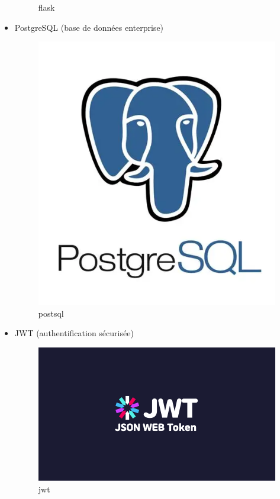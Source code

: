 \begin{itemize}
\begin{figure}[H]
    \caption{flask}
    \label{fig:flask}
\end{figure}
    \item PostgreSQL (base de données enterprise)
     \begin{figure}[H]
    \centering
    \includegraphics[width=\figwidth]{img/postsql.png}
    \caption{postsql}
    \label{fig:postsql}
\end{figure}
    
    \item JWT (authentification sécurisée)
     \begin{figure}[H]
    \centering
    \includegraphics[width=\figwidth]{img/jwtt (1).png}
    \caption{jwt}
    \label{fig:jwt}
\end{figure}
\end{itemize}

